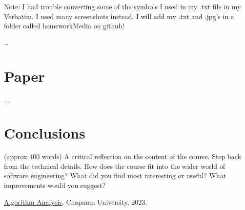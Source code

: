 \documentclass{article}
\theoremstyle{theorem}
\theoremstyle{definition}
\theoremstyle{remark}
\begin{document}
\noindent Note: I had trouble converting some of the symbols I used in my .txt file in my Verbatim. I used many screenshots instead. I will add my .txt and .jpg's in a folder called homeworkMedia on github!

\ldots

\section{Paper}

...

\section{Conclusions}\label{conclusions}

(approx 400 words) A critical reflection on the content of the course. Step back from the technical details. How does the course fit into the wider world of software engineering? What did you find most interesting or useful? What improvements would you suggest?

\begin{thebibliography}{99}
 \href{https://github.com/alexhkurz/algorithm-analysis-2023}{Algorithm Analysis}, Chapman University, 2023.
\end{thebibliography}
\end{document}
